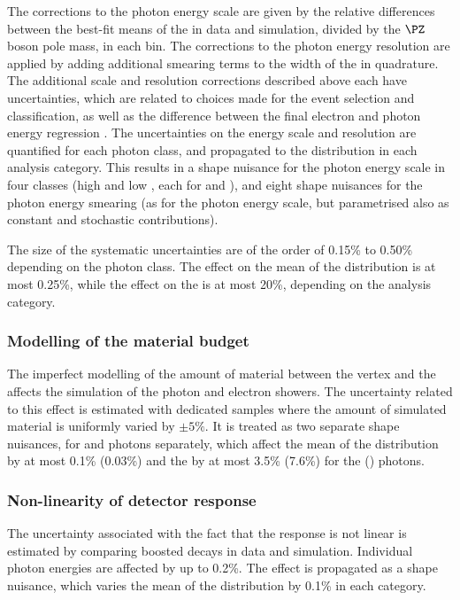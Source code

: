 The corrections to the photon energy scale are given by the relative differences between the best-fit means of the \CB in data and simulation, divided by the $\PZ$ boson pole mass, in each bin. The corrections to the photon energy resolution are applied by adding additional smearing terms to the width of the \CB in quadrature. The additional scale and resolution corrections described above each have uncertainties, which are related to choices made for the \Zee event selection and classification, as well as the difference between the final electron and photon energy regression \BDT\s. The uncertainties on the energy scale and resolution are quantified for each photon class, and propagated to the \mgg distribution in each analysis category. This results in a shape nuisance for the photon energy scale in four classes (high and low \RNINE, each for \EB and \EE), and eight shape nuisances for the photon energy smearing (as for the photon energy scale, but parametrised also as constant and stochastic contributions). 

The size of the systematic uncertainties are of the order of 0.15\% to 0.50\% depending on the photon class. The effect on the mean of the \mgg distribution is at most 0.25\%, while the effect on the \effSigma is at most 20\%, depending on the analysis category.


\subsubsection{Modelling of the material budget}
The imperfect modelling of the amount of material between the vertex and the \ECAL affects the simulation of the photon and electron showers. The uncertainty related to this effect is estimated with dedicated samples where the amount of simulated material is uniformly varied by $\pm 5\%$. It is treated as two separate shape nuisances, for \EB and \EE photons separately, which affect the mean of the \mgg distribution by at most 0.1\% (0.03\%) and the \effSigma by at most 3.5\% (7.6\%) for the \EB (\EE) photons.

\subsubsection{Non-linearity of detector response}
The uncertainty associated with the fact that the \ECAL response is not linear is estimated by comparing boosted \Zee decays in data and simulation. Individual photon energies are affected by up to 0.2\%. The effect is propagated as a shape nuisance, which varies the mean of the \mgg distribution by 0.1\% in each category.

